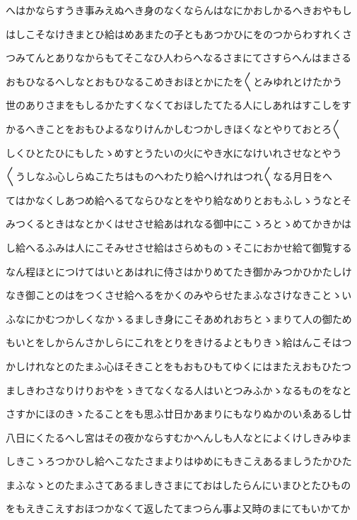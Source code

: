 \documentclass[a4paper,11pt,landscape]{ltjtarticle}
\begin{document}
へはかならすうき事みえぬへき身のなくならんはなにかおしかるへきおやもし
\par\medskip
はしこそなけきまとひ給はめあまたの子ともあつかひにをのつからわすれくさ
\par\medskip
つみてんとありなからもてそこなひ人わらへなるさまにてさすらへんはまさる
\par\medskip
おもひなるへしなとおもひなるこめきおほとかにたを〱とみゆれとけたかう
\par\medskip
世のありさまをもしるかたすくなくておほしたてたる人にしあれはすこしをす
\par\medskip
かるへきことをおもひよるなりけんかしむつかしきほくなとやりておとろ〱
\par\medskip
しくひとたひにもしたゝめすとうたいの火にやき水になけいれさせなとやう
\par\medskip
〱うしなふ心しらぬこたちはものへわたり給へけれはつれ〱なる月日をへ
\par\medskip
てはかなくしあつめ給へるてならひなとをやり給なめりとおもふしゝうなとそ
\par\medskip
みつくるときはなとかくはせさせ給あはれなる御中にこゝろとゝめてかきかは
\par\medskip
し給へるふみは人にこそみせさせ給はさらめものゝそこにおかせ給て御覧する
\par\medskip
なん程ほとにつけてはいとあはれに侍さはかりめてたき御かみつかひかたしけ
\par\medskip
なき御ことのはをつくさせ給へるをかくのみやらせたまふなさけなきことゝい
\par\medskip
ふなにかむつかしくなかゝるましき身にこそあめれおちとゝまりて人の御ため
\par\medskip
もいとをしからんさかしらにこれをとりをきけるよともりきゝ給はんこそはつ
\par\medskip
かしけれなとのたまふ心ほそきことをもおもひもてゆくにはまたえおもひたつ
\par\medskip
ましきわさなりけりおやをゝきてなくなる人はいとつみふかゝなるものをなと
\par\medskip
さすかにほのきゝたることをも思ふ廿日かあまりにもなりぬかのいゑあるし廿
\par\medskip
八日にくたるへし宮はその夜かならすむかへんしも人なとによくけしきみゆま
\par\medskip
しきこゝろつかひし給へこなたさまよりはゆめにもきこえあるましうたかひた
\par\medskip
まふなゝとのたまふさてあるましきさまにておはしたらんにいまひとたひもの
\par\medskip
をもえきこえすおほつかなくて返したてまつらん事よ又時のまにてもいかてか
\end{document}

